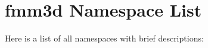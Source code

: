 \section{fmm3d Namespace List}
Here is a list of all namespaces with brief descriptions:\begin{CompactList}
\item{}
\end{CompactList}
